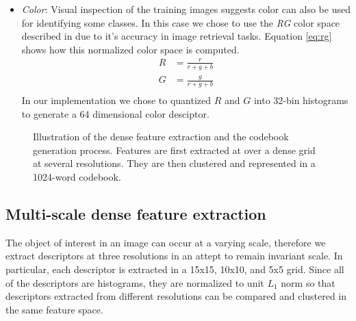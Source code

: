 \documentclass[12pt]{article}
\begin{document}
\begin{itemize}
\item \textit{Color}:
Visual inspection of the training images suggests color can also be used for identifying some classes.
In this case we chose to use the \emph{RG} color space described in \cite{sande10} due to it's accuracy in image retrieval tasks.
Equation \ref{eq:rg} shows how this normalized color space is computed.
\begin{equation}
\begin{split}
R &= \frac{r}{r+g+b} \\
G &= \frac{g}{r+g+b} \\
\end{split}
\label{eq:rg}
\end{equation}
In our implementation we chose to quantized $R$ and $G$ into 32-bin histograms to generate a 64 dimensional color desciptor.
\end{itemize}

\begin{figure}
\centering
{}
\caption{
Illustration of the dense feature extraction and the codebook generation process.
Features are first extracted at over a dense grid at several resolutions.
They are then clustered and represented in a 1024-word codebook.}
\label{fig:codebook}
\end{figure}

\subsection{Multi-scale dense feature extraction}
The object of interest in an image can occur at a varying scale, therefore we extract descriptors at three resolutions in an attept to remain invariant scale.
In particular, each descriptor is extracted in a 15x15, 10x10, and 5x5 grid.
Since all of the descriptors are histograms, they are normalized to unit $L_1$ norm so that descriptors extracted from different resolutions can be compared and clustered in the same feature space.
\end{document}
